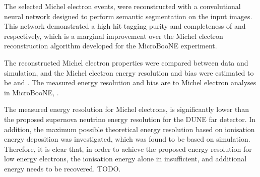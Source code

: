 The selected Michel electron events, were reconstructed with a convolutional
neural network designed to perform semantic segmentation on the input images. 
This network demonstrated a high hit tagging purity and completeness of
 and  respectively, which is a marginal 
improvement over the Michel electron reconstruction algorithm developed for 
the MicroBooNE experiment. 

The reconstructed Michel electron properties were compared between data and 
simulation, and the Michel electron energy resolution and bias were estimated 
to be  and . The measured energy resolution
and bias are  to 
Michel electron analyses in MicroBooNE, . 

The measured energy resolution for Michel electrons, is significantly lower than
the proposed supernova neutrino energy resolution for the DUNE far detector. In
addition, the maximum possible theoretical energy resolution based on ionisation
energy deposition was investigated, which was found to be  
based on \protodune{} simulation. Therefore, it is clear that, in order to 
achieve the proposed energy resolution for low energy electrons, the 
ionisation energy alone in insufficient, and additional energy needs to be 
recovered. TODO.

